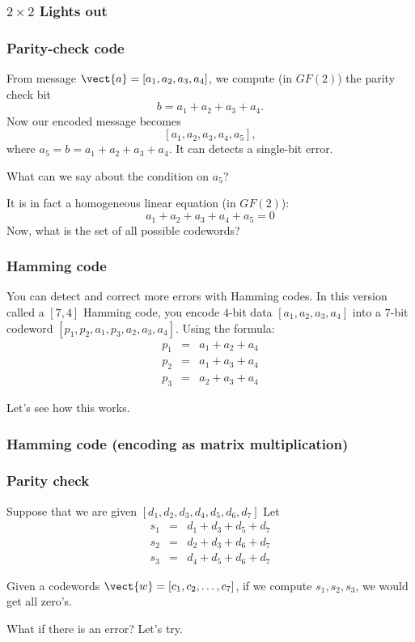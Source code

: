 \begin{frame}
  \frametitle{$2\times 2$ Lights out}
\end{frame}


\begin{frame}
  \frametitle{Parity-check code}

  \pause

  From message $\vect{a}=[a_1,a_2,a_3,a_4]$, we compute (in $GF(2)$)
  the parity check bit
  \[
  b = a_1 + a_2 + a_3 + a_4.
  \]
  \pause
  Now our encoded message becomes
  \[
  [a_1,a_2,a_3,a_4,a_5],
  \]
  where $a_5=b=a_1 + a_2 + a_3 + a_4$.  It can detects a single-bit
  error.
  \pause

  \vspace{0.2in}

  What can we say about the condition on $a_5$? \pause

  It is in fact a homogeneous linear equation (in $GF(2)$):
  \[
  a_1 + a_2 + a_3 + a_4+a_5 = 0
  \]
  \pause
  \vspace{0.1in}
  Now, what is the set of all possible codewords?
\end{frame}

\begin{frame}
  \frametitle{Hamming code}

  You can detect and correct more errors with Hamming codes.  In this
  version called a $[7,4]$ Hamming code, you encode $4$-bit data
  $[a_1,a_2,a_3,a_4]$ into a $7$-bit codeword
  $[p_1,p_2,a_1,p_3,a_2,a_3,a_4]$.  Using the formula:
  \[
  \begin{array}{rcl}
    p_1 &=& a_1 + a_2 + a_4\\
    p_2 &=& a_1 + a_3 + a_4\\
    p_3 &=& a_2 + a_3 + a_4
  \end{array}
  \]
  \pause

  Let's see how this works.

  \vspace{1.5in}
  
\end{frame}

\begin{frame}
  \frametitle{Hamming code (encoding as matrix multiplication)}
  

\end{frame}

\begin{frame}
  \frametitle{Parity check}
  Suppose that we are given $[d_1,d_2,d_3,d_4,d_5,d_6,d_7]$
  Let
  \[
  \begin{array}{rcl}
    s_1 &=& d_1 + d_3 + d_5 + d_7\\
    s_2 &=& d_2 + d_3 + d_6 + d_7\\
    s_3 &=& d_4 + d_5 + d_6 + d_7
  \end{array}
  \]

  Given a codewords $\vect{w}=[c_1,c_2,\ldots,c_7]$, if we compute
  $s_1,s_2,s_3$, we would get all zero's.

  \pause

  What if there is an error?  Let's try.
  \vspace{1.5in}
\end{frame}

